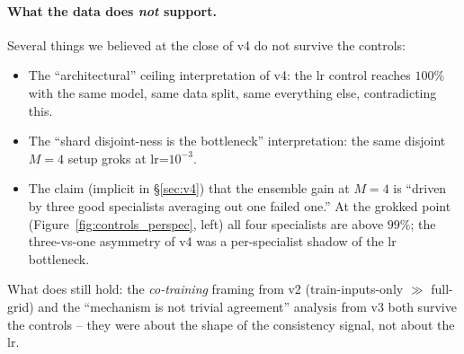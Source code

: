 \documentclass[11pt,a4paper]{article}
\begin{document}

\paragraph{What the data does \emph{not} support.}
Several things we believed at the close of v4 do not survive the
controls:
\begin{itemize}[leftmargin=*,itemsep=1pt]
  \item The ``architectural'' ceiling interpretation of v4: the lr
        control reaches $100\%$ with the same model, same data split,
        same everything else, contradicting this.
  \item The ``shard disjoint-ness is the bottleneck'' interpretation:
        the same disjoint $M{=}4$ setup groks at lr=$10^{-3}$.
  \item The claim (implicit in \S\ref{sec:v4}) that the ensemble gain
        at $M{=}4$ is ``driven by three good specialists averaging
        out one failed one.'' At the grokked point
        (Figure~\ref{fig:controls_perspec}, left) all four
        specialists are above $99\%$; the three-vs-one asymmetry of
        v4 was a per-specialist shadow of the lr bottleneck.
\end{itemize}
What does still hold: the \emph{co-training} framing from v2
(train-inputs-only $\gg$ full-grid) and the ``mechanism is not trivial
agreement'' analysis from v3 both survive the controls -- they were
about the shape of the consistency signal, not about the lr.
\end{document}
